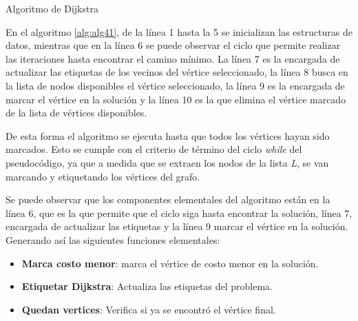 \begin{algorithm}[H]
    \begin{algorithmic}[1]
        \ENDWHILE
    \end{algorithmic}
    \caption{Algoritmo de Dijkstra}\label{alg:alg41}
\end{algorithm}

En el algoritmo \ref{alg:alg41}, de la línea 1 hasta la 5 se inicializan las estructuras de datos, mientras que en la línea 6 se puede observar el ciclo que permite realizar las iteraciones hasta encontrar el camino mínimo. La línea 7 es la encargada de actualizar las etiquetas de los vecinos del vértice seleccionado, la línea 8 busca en la lista de nodos disponibles el vértice seleccionado, la línea 9 es la encargada de marcar el vértice en la solución y la línea 10 es la que elimina el vértice marcado de la lista de vértices disponibles.

De esta forma el algoritmo se ejecuta hasta que todos los vértices hayan sido marcados. Esto se cumple con el criterio de término del ciclo \emph{while} del pseudocódigo, ya que a medida que se extraen los nodos de la lista \emph{L}, se van marcando y etiquetando los vértices del grafo.

Se puede observar que los componentes elementales del algoritmo están en la línea 6, que es la que permite que el ciclo siga hasta encontrar la solución, línea 7, encargada de actualizar las etiquetas y la línea 9  marcar el vértice en la solución. Generando así las siguientes funciones elementales:

\begin{itemize}


\item \textbf{Marca costo menor}: marca el vértice de costo menor en la solución.

\item \textbf{Etiquetar Dijkstra}: Actualiza las etiquetas del problema.

\item \textbf{Quedan vertices}: Verifica si ya se encontró el vértice final.
\end{itemize}

